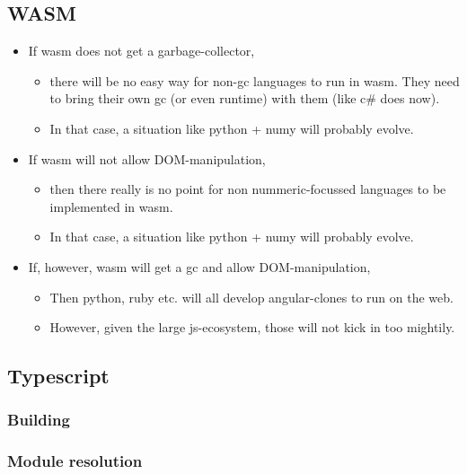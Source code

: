 \subsection{WASM}
\begin{itemize}
    \item If wasm does not get a garbage-collector, 
        \begin{itemize}
            \item there will be no easy way for non-gc languages to run in wasm. They need to bring their own gc (or even runtime) with them (like c\# does now). 
            \item In that case, a situation like python + numy will probably evolve.
        \end{itemize}
    \item If wasm will not allow DOM-manipulation, 
        \begin{itemize}
            \item then there really is no point for non nummeric-focussed languages to be implemented in wasm.
            \item In that case, a situation like python + numy will probably evolve.
        \end{itemize}
    \item If, however, wasm will get a gc and allow DOM-manipulation, 
        \begin{itemize}
            \item Then python, ruby etc. will all develop angular-clones to run on the web. 
            \item However, given the large js-ecosystem, those will not kick in too mightily. 
        \end{itemize}
\end{itemize}

\subsection{Typescript}

\subsubsection{Building}

\subsubsection{Module resolution}